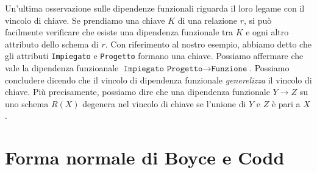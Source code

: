 \documentclass[12pt]{report}
\begin{document}
	Un'ultima osservazione sulle dipendenze funzionali riguarda il loro legame con il vincolo di chiave. Se prendiamo una chiave $K$ di una relazione $r$, si può facilmente verificare che esiste una dipendenza funzionale tra $K$ e ogni altro attributo dello schema di $r$. Con riferimento al nostro esempio, abbiamo detto che gli attributi \texttt{Impiegato} e \texttt{Progetto} formano una chiave. Possiamo affermare che vale la dipendenza funzioanale $\texttt{Impiegato Progetto} \to \texttt{Funzione}$.
	Possiamo concludere dicendo che il vincolo di dipendenza funzionale \textit{generelizza} il vincolo di chiave. Più precisamente, possiamo dire che una dipendenza funzionale $Y \to Z$ su uno schema $R\left(X\right)$ degenera nel vincolo di chiave se l'unione di $Y$ e $Z$ è pari a $X$.
	\section{Forma normale di Boyce e Codd}
\end{document}
